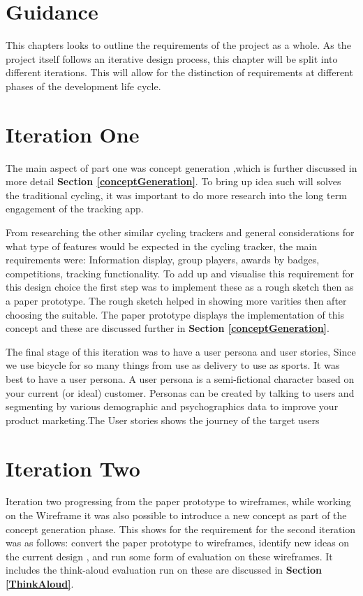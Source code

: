 \documentclass{l4proj}
\begin{document}
\section{Guidance}

This chapters looks to outline the requirements of the project as a whole. As the project itself follows an iterative design process, this chapter will be split into different iterations. This will allow for the distinction of requirements at different phases of the development life cycle.

\section{Iteration One}


The main aspect of part one was concept generation ,which is further discussed in more detail \textbf{Section \ref{conceptGeneration}}.
To bring up idea such will solves the traditional cycling, it was important to do more research into the long term engagement of the tracking app. 

From researching the other similar cycling trackers and general considerations for what type of features would be expected in the cycling tracker, the main requirements were: Information display, group players, awards by badges, competitions, tracking functionality. To add up and visualise this requirement for this design choice the first step was to implement these as a rough sketch then as a paper prototype. The rough sketch helped in showing more varities then after choosing the suitable. The paper prototype displays the implementation  of this concept and these are discussed further in \textbf{Section \ref{conceptGeneration}}.

The final stage of this iteration was to have a user persona and user stories,  Since we use bicycle for so many things from use as delivery to use as sports. It was best to have a user persona.
A user persona is a semi-fictional character based on your current (or ideal) customer. Personas can be created by talking to users and segmenting by various demographic and psychographics data to improve your product marketing.The User stories shows the journey of the target users




\section{Iteration Two}
Iteration two progressing from the paper prototype to wireframes, while working on the Wireframe it was also possible to introduce a new concept as part of the concept generation phase. This shows for the requirement for the second iteration was as follows: convert the paper prototype to wireframes, identify new ideas on the current design , and run some form of evaluation on these wireframes. It includes the think-aloud evaluation run on these are discussed in \textbf{Section \ref{ThinkAloud}}.
\end{document}

